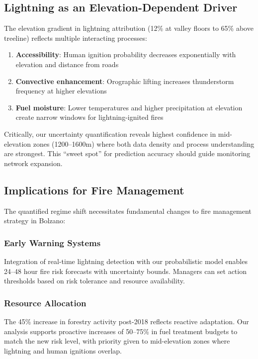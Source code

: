 \documentclass[11pt,a4paper]{article}
\begin{document}
\subsection{Lightning as an Elevation-Dependent Driver}

The elevation gradient in lightning attribution (12\% at valley floors to 65\% above treeline) reflects multiple interacting processes:
\begin{enumerate}
    \item \textbf{Accessibility}: Human ignition probability decreases exponentially with elevation and distance from roads
    \item \textbf{Convective enhancement}: Orographic lifting increases thunderstorm frequency at higher elevations
    \item \textbf{Fuel moisture}: Lower temperatures and higher precipitation at elevation create narrow windows for lightning-ignited fires
\end{enumerate}

Critically, our uncertainty quantification reveals highest confidence in mid-elevation zones (1200--1600m) where both data density and process understanding are strongest. This ``sweet spot'' for prediction accuracy should guide monitoring network expansion.

\subsection{Implications for Fire Management}

The quantified regime shift necessitates fundamental changes to fire management strategy in Bolzano:

\subsubsection{Early Warning Systems}
Integration of real-time lightning detection with our probabilistic model enables 24--48 hour fire risk forecasts with uncertainty bounds. Managers can set action thresholds based on risk tolerance and resource availability.

\subsubsection{Resource Allocation}
The 45\% increase in forestry activity post-2018 reflects reactive adaptation. Our analysis supports proactive increases of 50--75\% in fuel treatment budgets to match the new risk level, with priority given to mid-elevation zones where lightning and human ignitions overlap.
\end{document}
